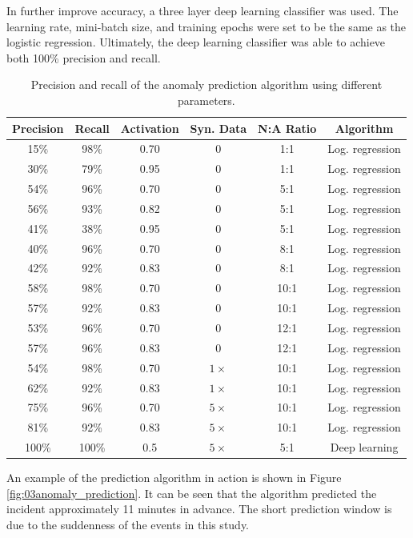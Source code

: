 In further improve accuracy, a three layer deep learning classifier was used.  The learning rate, mini-batch size, and training epochs were set to be the same as the logistic regression.  Ultimately, the deep learning classifier was able to achieve both 100\% precision and recall.

\begin{table}[H]
    \centering
    \begin{tabular}{ c | c | c | c | c | c}
        Precision & Recall & Activation & Syn. Data & N:A Ratio & Algorithm\\
        \hline
        15\% & 98\% & 0.70 & 0 & 1:1 & Log. regression  \\
        30\% & 79\% & 0.95 & 0 & 1:1 & Log. regression  \\
        54\% & 96\% & 0.70 & 0 & 5:1 & Log. regression  \\
        56\% & 93\% & 0.82 & 0 & 5:1 & Log. regression  \\
        41\% & 38\% & 0.95 & 0 & 5:1 & Log. regression  \\
        40\% & 96\% & 0.70 & 0 & 8:1 & Log. regression  \\
        42\% & 92\% & 0.83 & 0 & 8:1 & Log. regression  \\
        58\% & 98\% & 0.70 & 0 & 10:1 & Log. regression  \\
        57\% & 92\% & 0.83 & 0 & 10:1 & Log. regression  \\
        53\% & 96\% & 0.70 & 0 & 12:1 & Log. regression  \\
        57\% & 96\% & 0.83 & 0 & 12:1 & Log. regression  \\
        54\% & 98\% & 0.70 & $1 \times$  & 10:1 & Log. regression  \\
        62\% & 92\% & 0.83 & $1 \times$ & 10:1 & Log. regression  \\
        75\% & 96\% & 0.70 & $5 \times$ & 10:1 & Log. regression  \\
        81\% & 92\% & 0.83 & $5 \times$ & 10:1 & Log. regression  \\
        100\% & 100\% & 0.5 & $5 \times$ & 5:1 & Deep learning  \\
    \end{tabular}
    \caption{Precision and recall of the anomaly prediction algorithm using different parameters.}
    \label{tab:03anomaly_pred_results}
\end{table}

An example of the prediction algorithm in action is shown in Figure \ref{fig:03anomaly_prediction}.  It can be seen that the algorithm predicted the incident approximately 11 minutes in advance. The short prediction window is due to the suddenness of the events in this study.

